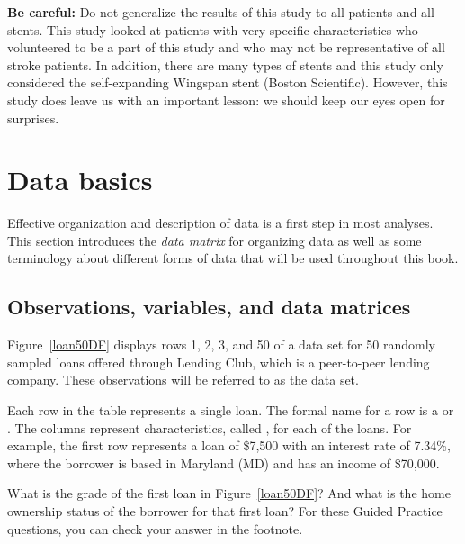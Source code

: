 \textbf{Be careful:}
Do not generalize the results of this study to all patients
and all stents.
This study looked at patients with very specific characteristics
who volunteered to be a part of this study and who may not be
representative of all stroke patients.
In addition, there are many types of stents and this study only
considered the self-expanding Wingspan stent (Boston Scientific).
However, this study does leave us with an important lesson:
we should keep our eyes open for surprises.




\section{Data basics}
\label{dataBasics}

Effective organization and description of data is a first
step in most analyses.
This section introduces the \emph{data matrix} for organizing
data as well as some terminology about different forms of data
that will be used throughout this book.

\subsection{Observations, variables, and data matrices}


Figure~\ref{loan50DF} displays rows 1, 2, 3, and 50 of a data set
for 50 randomly sampled loans offered through Lending Club,
which is a peer-to-peer lending company.
These observations will be referred to as the
 data set.

Each row in the table represents a single loan.
The formal name for a row is a 
or .
The columns represent characteristics,
called ,
for each of the loans.
For example, the first row represents a loan of \$7,500 with an interest rate of 7.34\%, where the borrower is based in Maryland (MD) and has an income of \$70,000.

\begin{exercisewrap}
\begin{nexercise}
What is the grade of the first loan in Figure~\ref{loan50DF}?
And what is the home ownership status of the borrower
for that first loan?
For these Guided Practice questions, you can check your answer
in the footnote.\footnotemark{}
\end{nexercise}
\end{exercisewrap}

